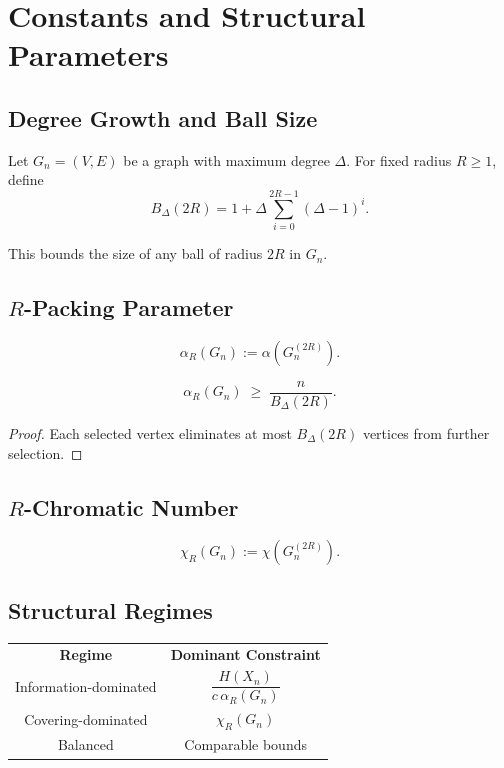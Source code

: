 \chapter{Constants and Structural Parameters}

\section{Degree Growth and Ball Size}

Let $G_n=(V,E)$ be a graph with maximum degree $\Delta$.
For fixed radius $R\ge 1$, define
\[
B_\Delta(2R)
=
1+\Delta\sum_{i=0}^{2R-1}(\Delta-1)^i.
\]

This bounds the size of any ball of radius $2R$ in $G_n$.

\section{$R$-Packing Parameter}

\begin{definition}
\[
\alpha_R(G_n) := \alpha(G_n^{(2R)}).
\]
\end{definition}

\begin{lemma}
\[
\alpha_R(G_n)
\;\ge\;
\frac{n}{B_\Delta(2R)}.
\]
\end{lemma}

\begin{proof}
Each selected vertex eliminates at most $B_\Delta(2R)$ vertices from further selection.
\end{proof}

\section{$R$-Chromatic Number}

\begin{definition}
\[
\chi_R(G_n) := \chi(G_n^{(2R)}).
\]
\end{definition}

\section{Structural Regimes}

\begin{center}
\begin{tabular}{cc}
\textbf{Regime} & \textbf{Dominant Constraint} \\
Information-dominated 
& $\dfrac{H(X_n)}{c\,\alpha_R(G_n)}$ \\
Covering-dominated 
& $\chi_R(G_n)$ \\
Balanced 
& Comparable bounds \\
\end{tabular}
\end{center}

